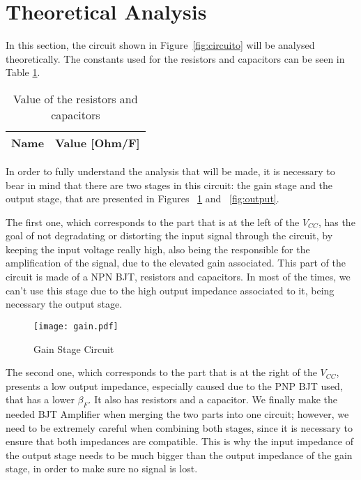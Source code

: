 \section{Theoretical Analysis}
\label{sec:analysis}

\hspace{0,5cm} In this section, the  circuit shown in Figure~\ref{fig:circuito} will be analysed theoretically.
The constants used for the resistors and capacitors can be seen in Table \ref{tab:mat1}.

\begin{table}[H]
  \centering
  \begin{tabular}{|l|r|}
    \hline    
    {\bf Name} & {\bf Value [Ohm/F]} \\ \hline
    
  \end{tabular}
  \caption{Value of the resistors and capacitors}
  \label{tab:mat1}
\end{table}

In order to fully understand the analysis that will be made, it is necessary to bear in mind that there are two stages in this circuit: the gain stage and the output stage, that are presented in Figures ~\ref{fig:gain} and ~\ref{fig:output}. 

The first one, which corresponds to the part that is at the left of the $V_{CC}$, has the goal of not degradating or distorting the input signal through the circuit, by keeping the input voltage really high, also being the responsible for the amplification of the signal, due to the elevated gain associated. This part of the circuit is made of a NPN BJT, resistors and capacitors. In most of the times, we can't use this stage due to the high output impedance associated to it, being necessary the output stage.


\begin{figure}[H] \centering
\texttt{[image: gain.pdf]}
\caption{Gain Stage Circuit}
\label{fig:gain}
\end{figure}


The second one, which corresponds to the part that is at the right of the $V_{CC}$, presents a low output impedance, especially caused due to the PNP BJT used, that has a lower $\beta_F$. It also has resistors and a capacitor. We finally make the needed BJT Amplifier when merging the two parts into one circuit; however, we need to be extremely careful when combining both stages, since it is necessary to ensure that both impedances are compatible. This is why the input impedance of the output stage needs to be much bigger than the output impedance of the gain stage, in order to make sure no signal is lost.


